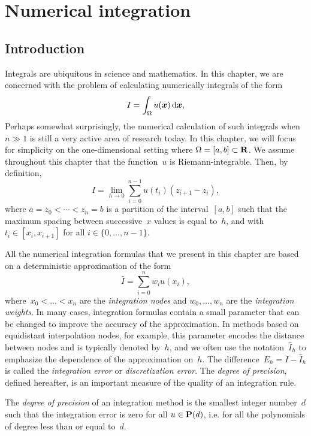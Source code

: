 \chapter{Numerical integration}
\label{cha:quadrature}

\minitoc

\section*{Introduction}
Integrals are ubiquitous in science and mathematics.
In this chapter,
we are concerned with the problem of calculating numerically integrals of the form
\begin{equation}
    \label{eq:integral}
    I = \int_{\Omega} u(\mathbf{\boldsymbol{x}}) \, \mathrm d \mathbf{\boldsymbol{x}},
\end{equation}
Perhaps somewhat surprisingly,
the numerical calculation of such integrals when $n \gg 1$ is still a very active area of research today.
In this chapter,
we will focus for simplicity on the one-dimensional setting where $\Omega = [a, b] \subset \mathbf R$.
We assume throughout this chapter that the function~$u$ is Riemann-integrable.
Then, by definition,
\[
    I = \lim_{h \to 0}
    \sum_{i=0}^{n-1} u(t_i) (z_{i+1} - z_i),
\]
where $a = z_0 < \dotsb < z_n = b$ is a partition of the interval~$[a, b]$ such that the maximum spacing between successive~$x$ values is equal to~$h$,
and with $t_i \in [x_i, x_{i+1}]$ for all $i \in \{0, \dotsc, n-1\}$.

All the numerical integration formulas that we present in this chapter are based on a deterministic approximation of the form
\begin{equation}
    \label{eq:deterministic_integration}
    \widehat I = \sum_{i=0}^{n} w_i u(x_i),
\end{equation}
where~$x_0 < \dotsc < x_n$ are the \emph{integration nodes} and $w_0, \dotsc, w_n$ are the \emph{integration weights}.
In many cases, integration formulas contain a small parameter that can be changed to improve the accuracy of the approximation.
In methods based on equidistant interpolation nodes,
for example, this parameter encodes the distance between nodes and is typically denoted by~$h$,
and we often use the notation~$\widehat I_h$ to emphasize the dependence of the approximation on~$h$.
The difference~$E_h = I - \widehat I_h$ is called the \emph{integration error} or \emph{discretization error}.
The \emph{degree of precision},
defined hereafter,
is an important measure of the quality of an integration rule.
\begin{definition}
        The \emph{degree of precision} of an integration method is the smallest integer number~$d$ such that
        the integration error is zero for all $u \in \mathbf P(d)$,
        i.e. for all the polynomials of degree less than or equal to~$d$.
\end{definition}

